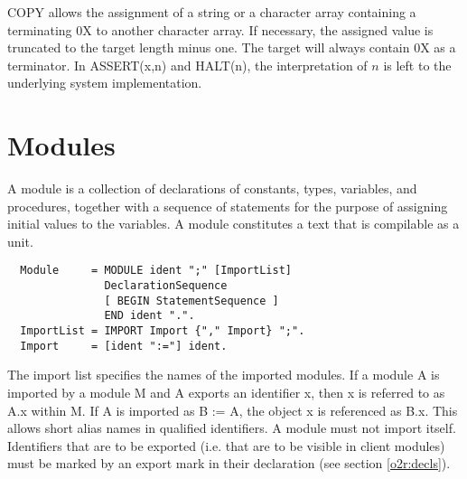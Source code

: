 \noindent
COPY allows the assignment of a string or a character array
containing a terminating 0X to another character array.
If necessary, the assigned value is truncated
to the target length minus one.
The target will always contain 0X as a terminator.
In ASSERT(x,n) and HALT(n),
the interpretation of $n$ is left to the underlying system
implementation.

\section{Modules}\label{o2r:module}

A module is a collection of declarations of constants, types, variables,
and procedures, together with a sequence of statements for the purpose
of assigning initial values to the variables. A module constitutes
a text that is compilable as a unit.
{\BNFsize
\begin{verbatim}
  Module     = MODULE ident ";" [ImportList]
               DeclarationSequence
               [ BEGIN StatementSequence ]
               END ident ".".
  ImportList = IMPORT Import {"," Import} ";".
  Import     = [ident ":="] ident.
\end{verbatim}}
The import list specifies the names of the imported modules. If a
module A is imported by a module M and A exports an identifier x,
then x is referred to as A.x within M. If A is imported as B := A,
the object x is referenced as B.x. This allows short alias names in
qualified identifiers. A module must not import itself.
Identifiers that are to be exported (i.e. that
are to be visible in client modules) must be marked by an export mark
in their declaration (see section \ref{o2r:decls}).

